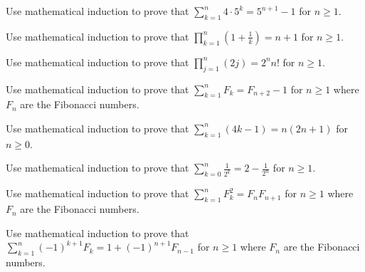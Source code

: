 \begin{exer}[\exerP] %
\label{exer_math_ind_geom_sum5}
    Use mathematical induction to prove that $\displaystyle \sum_{k=1}^n4 \cdot 5^k = 5^{n+1}-1$ for $n\ge 1$.
\end{exer}

\begin{exer}[\exerP] %
\label{exer_math_ind_prod_1plus_recip}
    Use mathematical induction to prove that $\displaystyle \prod_{k=1}^n \left(1 + \frac{1}{k}\right) = n+1$ for $n\ge 1$.
\end{exer}

\begin{exer}[\exerP] %
\label{exer_math_ind_prod_evens}
    Use mathematical induction to prove that $\displaystyle \prod_{j=1}^n(2j) = 2^nn!$ for $n \ge 1$.
\end{exer}

\begin{exer} [\exerP] %
\label{exer_sum_firstn_Fib_proof}
    Use mathematical induction to prove that $\displaystyle\sum_{k=1}^nF_k = F_{n+2}-1$ for $n \ge 1$ where $F_n$ are the Fibonacci numbers.   %
\end{exer}

\begin{exer}[\exerU] %
\label{exer_math_ind_sum_4kplus1}
    Use mathematical induction to prove that $\displaystyle \sum_{k=1}^n(4k-1) = n(2n+1)$ for $n\ge 0$.   
\end{exer}

\begin{exer}[\exerU] %
\label{exer_math_ind_sum_recip_powers2}
   Use mathematical induction to prove that $\displaystyle \sum_{k=0}^n\frac{1}{2^k} = 2 - \frac{1}{2^n}$ for $n \ge 1$.
\end{exer}

\begin{exer}[\exerU] %
\label{exer_sum_firstn_Fib_sq_proof}
    Use mathematical induction to prove that $\displaystyle\sum_{k=1}^nF_k^2= F_nF_{n+1}$ for $n \ge 1$ where $F_n$ are the Fibonacci numbers. %
\end{exer}

\begin{exer}[\exerU] %
\label{exer_sum_alt_fib_proof}
    Use mathematical induction to prove that    
    $\displaystyle\sum_{k=1}^n(-1)^{k+1}F_k = 1+(-1)^{n+1}F_{n-1}$ for $n \ge 1$ where $F_n$ are the Fibonacci numbers. %
\end{exer}

